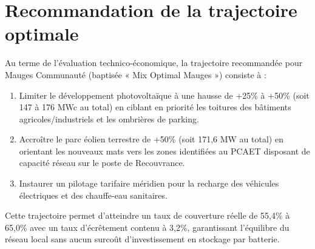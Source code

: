 \documentclass[12pt, a4paper]{report}
\begin{document}
\section{Recommandation de la trajectoire optimale}

Au terme de l'évaluation technico-économique, la trajectoire recommandée pour Mauges Communauté (baptisée « Mix Optimal Mauges ») consiste à :
\begin{enumerate}
  \item Limiter le développement photovoltaïque à une hausse de +25\% à +50\% (soit 147 à 176 MWc au total) en ciblant en priorité les toitures des bâtiments agricoles/industriels et les ombrières de parking.
  \item Accroître le parc éolien terrestre de +50\% (soit 171,6 MW au total) en orientant les nouveaux mats vers les zones identifiées au PCAET disposant de capacité réseau sur le poste de Recouvrance.
  \item Instaurer un pilotage tarifaire méridien pour la recharge des véhicules électriques et des chauffe-eau sanitaires.
\end{enumerate}

Cette trajectoire permet d'atteindre un taux de couverture réelle de 55,4\% à 65,0\% avec un taux d'écrêtement contenu à 3,2\%, garantissant l'équilibre du réseau local sans aucun surcoût d'investissement en stockage par batterie.
\end{document}
